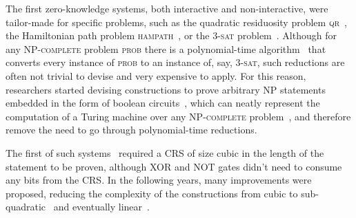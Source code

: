 The first zero-knowledge systems, both interactive and non-interactive, were tailor-made for 
specific problems, such as the quadratic residuosity problem \textsc{qr}~\cite{GoldwasserMR1989}, 
the Hamiltonian path problem \textsc{hampath}~\cite{LapidotS1991}, or the \(3\)-\textsc{sat} 
problem~\cite{BlumSMP1991}.
Although for any \textsc{NP-complete} problem \textsc{prob} there is a polynomial-time 
algorithm~\cite{Karp1972} that converts every instance of \textsc{prob} to an instance 
of, say, \(3\)-\textsc{sat}, such reductions are often not trivial to devise and very expensive 
to apply.
For this reason, researchers started devising constructions to prove arbitrary NP statements 
embedded in the form of boolean circuits~\cite{Damgard1993}, which can neatly represent the 
computation of a Turing machine over any \textsc{NP-complete} problem~\cite{Cook1971}, and 
therefore remove the need to go through polynomial-time reductions.

The first of such systems~\cite{Damgard1993} required a CRS of size cubic in the length of the 
statement to be proven, although XOR and NOT gates didn't need to consume any bits from the CRS\@.
In the following years, many improvements were proposed, reducing the complexity of the 
constructions from cubic to sub-quadratic~\cite{BoyarBP1995} and eventually linear~\cite{CramerD1997}.
